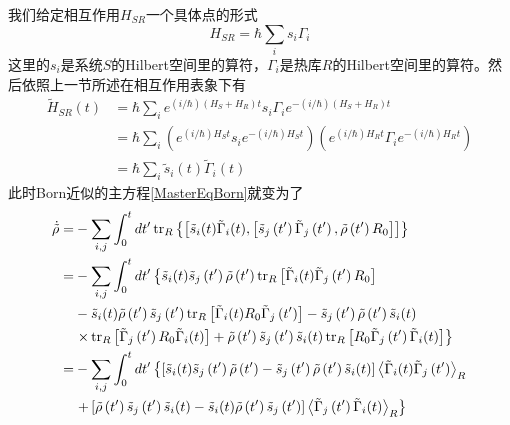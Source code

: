 我们给定相互作用$H_{SR}$一个具体点的形式
\begin{equation}
H_{S R}=\hbar \sum_{i} s_{i} \Gamma_{i}
\label{HsrSpec}
\end{equation}
这里的$s_{i}$是系统$S$的Hilbert空间里的算符，$\Gamma_{i}$是热库$R$的Hilbert空间里的算符。然后依照上一节所述在相互作用表象下有
\begin{equation}
\begin{aligned}
\tilde{H}_{S R}(t) &=\hbar \sum_{i} e^{(i / \hbar)\left(H_{S}+H_{R}\right) t} s_{i} \Gamma_{i} e^{-(i / \hbar)\left(H_{S}+H_{R}\right) t} \\
&=\hbar \sum_{i}\left(e^{(i / \hbar) H_{S} t} s_{i} e^{-(i / \hbar) H_{S} t}\right)\left(e^{(i / \hbar) H_{R} t} \Gamma_{i} e^{-(i / \hbar) H_{R} t}\right) \\
&=\hbar \sum_{i} \tilde{s}_{i}(t) \tilde{\Gamma}_{i}(t)
\label{HsrSpec2}
\end{aligned}
\end{equation}
此时Born近似的主方程\eqref{MasterEqBorn}就变为了
\begin{align}
\dot{\tilde{\rho}}=&-\sum_{i, j} \int_{0}^{t} d t^{\prime} \operatorname{tr}_{R}\left\{\left[\tilde{s}_{i}(t) \tilde{\Gamma}_{i}(t),\left[\tilde{s}_{j}\left(t^{\prime}\right) \tilde{\Gamma}_{j}\left(t^{\prime}\right), \tilde{\rho}\left(t^{\prime}\right) R_{0}\right]\right]\right\} \notag \\
=&-\sum_{i, j} \int_{0}^{t} d t^{\prime}\left\{\tilde{s}_{i}(t) \tilde{s}_{j}\left(t^{\prime}\right) \tilde{\rho}\left(t^{\prime}\right) \operatorname{tr}_{R}\left[\tilde{\Gamma}_{i}(t) \tilde{\Gamma}_{j}\left(t^{\prime}\right) R_{0}\right]\right. \notag \\
&-\tilde{s}_{i}(t) \tilde{\rho}\left(t^{\prime}\right) \tilde{s}_{j}\left(t^{\prime}\right) \operatorname{tr}_{R}\left[\tilde{\Gamma}_{i}(t) R_{0} \tilde{\Gamma}_{j}\left(t^{\prime}\right)\right]-\tilde{s}_{j}\left(t^{\prime}\right) \tilde{\rho}\left(t^{\prime}\right) \tilde{s}_{i}(t) \notag \\
&\left.\times \operatorname{tr}_{R}\left[\tilde{\Gamma}_{j}\left(t^{\prime}\right) R_{0} \tilde{\Gamma}_{i}(t)\right]+\tilde{\rho}\left(t^{\prime}\right) \tilde{s}_{j}\left(t^{\prime}\right) \tilde{s}_{i}(t) \operatorname{tr}_{R}\left[R_{0} \tilde{\Gamma}_{j}\left(t^{\prime}\right) \tilde{\Gamma}_{i}(t)\right]\right\} \notag \\
=&-\sum_{i, j} \int_{0}^{t} d t^{\prime}\left\{\left[\tilde{s}_{i}(t) \tilde{s}_{j}\left(t^{\prime}\right) \tilde{\rho}\left(t^{\prime}\right)-\tilde{s}_{j}\left(t^{\prime}\right) \tilde{\rho}\left(t^{\prime}\right) \tilde{s}_{i}(t)\right]\left\langle\tilde{\Gamma}_{i}(t) \tilde{\Gamma}_{j}\left(t^{\prime}\right)\right\rangle_{R}\right. \label{MasterEqBorn2} \\
&\left.+\left[\tilde{\rho}\left(t^{\prime}\right) \tilde{s}_{j}\left(t^{\prime}\right) \tilde{s}_{i}(t)-\tilde{s}_{i}(t) \tilde{\rho}\left(t^{\prime}\right) \tilde{s}_{j}\left(t^{\prime}\right)\right]\left\langle\tilde{\Gamma}_{j}\left(t^{\prime}\right) \tilde{\Gamma}_{i}(t)\right\rangle_{R}\right\} \notag 
\end{align}
